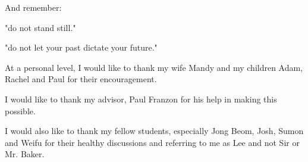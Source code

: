 \begin{biography}

And remember:

"do not stand still."  

"do not let your past dictate your future."


\end{biography}

\begin{acknowledgements}
At a personal level, I would like to thank my wife Mandy and my children Adam, Rachel and Paul for their encouragement.

I would like to thank my advisor, Paul Franzon for his help in making this possible.

I would also like to thank my fellow students, especially Jong Beom, Josh, Sumon and Weifu for their healthy discussions and referring to me as Lee and not Sir or Mr. Baker.

\end{acknowledgements}


\iftrue

\thesistableofcontents

\thesislistoftables

\thesislistoffigures

\fi

